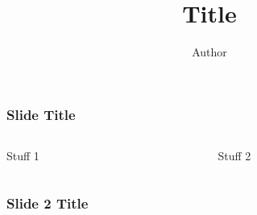 \documentclass{beamer}
\begin{document}
\title{Title}
\author{Author}
\maketitle

\begin{frame}
\frametitle{Slide Title}

\begin{columns}[t]
  \begin{column}[T]{0.5\textwidth}
  Stuff 1
  \end{column}
  \begin{column}[T]{0.5\textwidth}
  Stuff 2
  \end{column}
\end{columns}
  
\end{frame}


\begin{frame}
\frametitle{Slide 2 Title}

  \begin{figure}[h!]
    \centering
    \begin{subfigure}[b]{0.35\textwidth}
      \caption{}
      \label{fig:}
    \end{subfigure}
    \begin{subfigure}[b]{0.35\textwidth}
      \caption{}
      \label{fig:}
    \end{subfigure}
    \caption{}
    \label{fig:}
  \end{figure}


\end{frame}


\begin{frame}
\frametitle{}

\end{frame}

\end{document}
